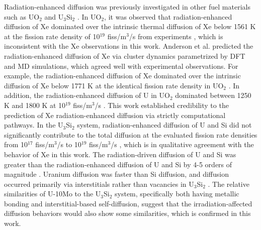 \documentclass[preprint,12pt]{elsarticle}
\begin{document}
\indent Radiation-enhanced diffusion was previously investigated in other fuel materials such as UO$_{2}$ and U$_{3}$Si$_{2}$ \cite{cooper2021irradiation, andersson2014atomistic, matthews2020cluster}. In UO$_{2}$, it was observed that radiation-enhanced diffusion of Xe dominated over the intrinsic thermal diffusion of Xe below 1561 K at the fission rate density of 10$^{19}$ fiss/m$^{3}$/s from experiments \cite{turnbull1982diffusion}, which is inconsistent with the Xe observations in this work. Anderson et al. \cite{andersson2014atomistic} predicted the radiation-enhanced diffusion of Xe via cluster dynamics parametrized by DFT and MD simulations, which agreed well with experimental observations. For example, the radiation-enhanced diffusion of Xe dominated over the intrinsic diffusion of Xe below 1771 K at the identical fission rate density in UO$_{2}$ \cite{turnbull1982diffusion, andersson2014atomistic}. In addition, the radiation-enhanced diffusion of U in UO$_{2}$ dominated between 1250 K and 1800 K at 10$^{19}$ fiss/m$^{3}$/s \cite{matthews2020cluster}. This work established credibility to the prediction of Xe radiation-enhanced diffusion via strictly computational pathways. In the U$_{3}$Si$_{2}$ system, radiation-enhanced diffusion of U and Si did not significantly contribute to the total diffusion at the evaluated fission rate densities from 10$^{17}$ fiss/m$^{3}$/s to 10$^{19}$ fiss/m$^{3}$/s \cite{cooper2021irradiation}, which is in qualitative agreement with the behavior of Xe in this work. The radiation-driven diffusion of U and Si was greater than the radiation-enhanced diffusion of U and Si by 4-5 orders of magnitude \cite{cooper2021irradiation}. Uranium diffusion was faster than Si diffusion, and diffusion occurred primarily via interstitials rather than vacancies in U$_{3}$Si$_{2}$ \cite{cooper2021irradiation, andersson2019density}. The relative similarities of U-10Mo to the U$_{3}$Si$_{2}$ system, specifically both having metallic bonding and interstitial-based self-diffusion, suggest that the irradiation-affected diffusion behaviors would also show some similarities, which is confirmed in this work.\\
\end{document}
